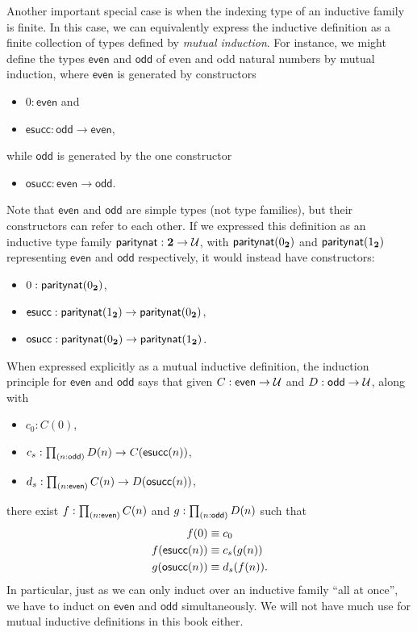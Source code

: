 %
%
Another important special case is when the indexing type of an inductive family is finite.
In this case, we can equivalently express the inductive definition as a finite collection of types defined by \emph{mutual induction}.
For instance, we might define the types $\mathsf{even}$ and $\mathsf{odd}$ of even and odd natural numbers by mutual induction, where $\mathsf{even}$ is generated by constructors
\begin{itemize}
\item $0:\mathsf{even}$ and
\item $\mathsf{esucc} : \mathsf{odd}\to\mathsf{even}$,
\end{itemize}
while $\mathsf{odd}$ is generated by the one constructor
\begin{itemize}
\item $\mathsf{osucc} : \mathsf{even}\to \mathsf{odd}$.
\end{itemize}
Note that $\mathsf{even}$ and $\mathsf{odd}$ are simple types (not type families), but their constructors can refer to each other.
If we expressed this definition as an inductive type family $\mathsf{paritynat} : \mathbf{2} \to \mathcal{U}$, with $\mathsf{paritynat}({0_{\mathbf{2}}})$ and $\mathsf{paritynat}({1_{\mathbf{2}}})$ representing $\mathsf{even}$ and $\mathsf{odd}$ respectively, it would instead have constructors:
\begin{itemize}
\item $0 : \mathsf{paritynat}({0_{\mathbf{2}}})$,
\item $\mathsf{esucc} : \mathsf{paritynat}({1_{\mathbf{2}}}) \to \mathsf{paritynat}({0_{\mathbf{2}}})$,
\item $\mathsf{osucc} : \mathsf{paritynat}({0_{\mathbf{2}}}) \to \mathsf{paritynat}({1_{\mathbf{2}}})$.
\end{itemize}
When expressed explicitly as a mutual inductive definition, the induction principle for $\mathsf{even}$ and $\mathsf{odd}$ says that given $C:\mathsf{even}\to\mathcal{U}$ and $D:\mathsf{odd}\to\mathcal{U}$, along with
\begin{itemize}
\item $c_0 : C(0)$,
\item $c_s : \prd{n:\mathsf{odd}} D(n) \to C(\mathsf{esucc}(n))$,
\item $d_s : \prd{n:\mathsf{even}} C(n) \to D(\mathsf{osucc}(n))$,
\end{itemize}
there exist $f:\prd{n:\mathsf{even}} C(n)$ and $g:\prd{n:\mathsf{odd}}D(n)$ such that
\begin{align*}
  f(0) &\equiv c_0\\
  f(\mathsf{esucc}(n)) &\equiv c_s(g(n))\\
  g(\mathsf{osucc}(n)) &\equiv d_s(f(n)).
\end{align*}
In particular, just as we can only induct over an inductive family ``all at once'', we have to induct on $\mathsf{even}$ and $\mathsf{odd}$ simultaneously.
We will not have much use for mutual inductive definitions in this book either.

